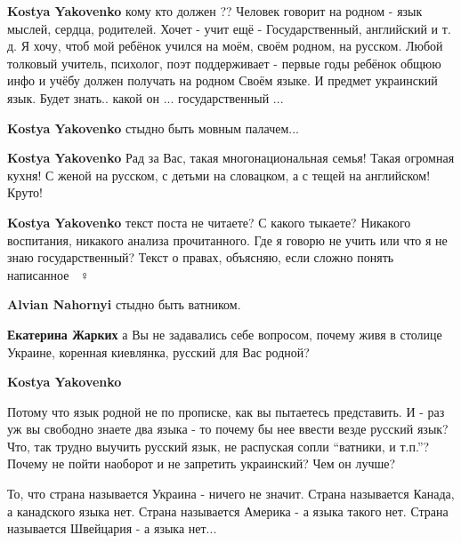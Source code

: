 \begin{itemize}
\begin{itemize}
\textbf{Kostya Yakovenko} кому кто должен ?? Человек говорит на родном - язык
мыслей, сердца, родителей. Хочет - учит ещё - Государственный, английский и т.
д. Я хочу, чтоб мой ребёнок учился на моём, своём родном, на русском. Любой
толковый учитель, психолог, поэт поддерживает - первые годы ребёнок общюю инфо
и учёбу должен получать на родном Своём языке. И предмет украинский язык. Будет
знать.. какой он ... государственный ...

\textbf{Kostya Yakovenko} стыдно быть мовным палачем...

\textbf{Kostya Yakovenko} Рад за Вас, такая многонациональная семья! Такая огромная кухня! С женой на русском, с детьми на словацком, а с тещей на английском! Круто!

\textbf{Kostya Yakovenko} текст поста не читаете? С какого тыкаете? Никакого
воспитания, никакого анализа прочитанного. Где я говорю не учить или что я не
знаю государственный? Текст о правах, объясняю, если сложно понять написанное
🤦🏼♀️

\textbf{Alvian Nahornyi} стыдно быть ватником.

\textbf{Екатерина Жарких} а Вы не задавались себе вопросом, почему живя в столице Украине, коренная киевлянка, русский для Вас родной?

\textbf{Kostya Yakovenko} 

Потому что язык родной не по прописке, как вы пытаетесь представить. И - раз уж
вы свободно знаете два языка - то почему бы нее ввести везде русский язык? Что,
так трудно выучить русский язык, не распуская сопли \enquote{ватники, и т.п.}? Почему
не пойти наоборот и не запретить украинский? Чем он лучше?

То, что страна называется Украина - ничего не значит. Страна называется Канада,
а канадского языка нет. Страна называется Америка - а языка такого нет. Страна
называется Швейцария - а языка нет...


\end{itemize}
\end{itemize}
